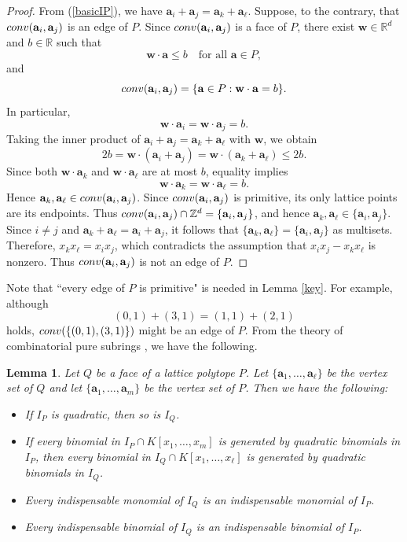 \documentclass[10pt,a4paper]{amsart}
\newtheorem{lemma}[thm]{Lemma}
\numberwithin{thm}{section}
\numberwithin{equation}{section}
\def\NZQ{\mathbb}               %
\def\ZZ{{\NZQ Z}}
\def\RR{{\NZQ R}}
\def\ab{{\mathbf a}}
\def\wb{{\mathbf w}}
\begin{document}
\begin{proof}
From (\ref{basicIP}), we have $\ab_i+\ab_j=\ab_k+\ab_\ell$.
Suppose, to the contrary, that 
${\rm conv}(\ab_i,\ab_j)$ is an edge of $P$. 
Since ${\rm conv}(\ab_i,\ab_j)$ is a face of $P$, there exist $\wb\in\RR^d$ and $b\in\RR$ such that \[ \wb\cdot\ab\leq b \quad\text{for all $\ab\in P$}, \] and \[ {\rm conv}(\ab_i,\ab_j)=\{\ab\in P:\wb\cdot\ab=b\}. \] 
In particular, \[ \wb\cdot\ab_i=\wb\cdot\ab_j=b. \] 
Taking the inner product of $\ab_i+\ab_j=\ab_k+\ab_\ell$ with $\wb$, we obtain \[ 2b = \wb\cdot(\ab_i+\ab_j) = \wb\cdot(\ab_k+\ab_\ell) \leq 2b. \] 
Since both $\wb\cdot\ab_k$ and $\wb\cdot\ab_\ell$ are at most $b$, equality implies \[ \wb\cdot\ab_k=\wb\cdot\ab_\ell=b. \] Hence $\ab_k,\ab_\ell\in {\rm conv}(\ab_i,\ab_j)$. 
Since ${\rm conv}(\ab_i,\ab_j)$ is primitive, its only lattice points are its endpoints. 
Thus ${\rm conv}(\ab_i,\ab_j)\cap\ZZ^d=\{\ab_i,\ab_j\}$, and hence $\ab_k,\ab_\ell\in\{\ab_i,\ab_j\}$. 
Since $i\neq j$ and $\ab_k+\ab_\ell=\ab_i+\ab_j$, it follows that $\{\ab_k,\ab_\ell\}=\{\ab_i,\ab_j\}$ as multisets. 
Therefore, $x_kx_\ell=x_ix_j$, which contradicts the assumption that $x_ix_j-x_kx_\ell$ is nonzero. 
Thus ${\rm conv}(\ab_i,\ab_j)$ is not an edge of $P$. 
\end{proof}

Note that ``every edge of $P$ is primitive" is needed in Lemma \ref{key}.
For example, although
\[
(0,1) + (3,1) = (1,1) + (2,1) 
\]
holds,
${\rm conv}(\{ (0,1), (3,1) \})$ might be an edge of $P$.
From the theory of combinatorial pure subrings \cite{cpureR1, cpure}, we have the following.

\begin{lemma}\label{cp}
    Let $Q$ be a face of a lattice polytope $P$.
    Let $\{\ab_1,\dots,\ab_\ell\}$ be the vertex set of $Q$
    and let $\{\ab_1,\dots,\ab_m\}$ be the vertex set of $P$.    
    Then we have the following{\rm :}
    \begin{itemize}
        \item[(i)]    If $I_P$ is quadratic,
    then so is $I_Q$.
    \item[(ii)] 
    If every binomial in \(I_P \cap K[x_1,\dots,x_m]\) is generated by quadratic binomials in \(I_P\), then every binomial in 
\(I_Q \cap K[x_1,\dots,x_\ell]\) is generated by quadratic binomials in \(I_Q\).  
\item[(iii)] Every indispensable monomial of $I_Q$ is an indispensable monomial of $I_P$. 
\item[(iv)] Every indispensable binomial of $I_Q$ is an indispensable binomial of $I_P$.
    \end{itemize}
 
\end{lemma}
\end{document}

